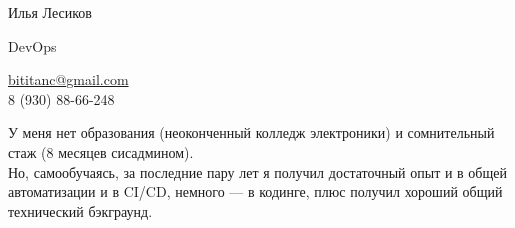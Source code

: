 \documentclass[10pt, a4paper]{article}
\begin{document}
\begin{spacing}{0.3}
{\LARGE Илья Лесиков}\\
\end{spacing}


{\setlength\multicolsep{0pt}%
\begin{multicols}{2}





\begin{spacing}{0.7}
  {\large DevOps}\hspace{1.55cm}{25 лет}\\
\end{spacing}

\columnbreak

\begin{flushright}
    \href{mailto:bititanc@gmail.com}{bititanc@gmail.com}\\
    8 (930) 88-66-248\\
\end{flushright}

\end{multicols}
}

\vspace{30pt}

У меня нет образования (неоконченный колледж электроники) и сомнительный стаж (8 месяцев сисадмином).\\
Но, самообучаясь, за последние пару лет я получил достаточный опыт и в общей автоматизации и в CI/CD, немного — в кодинге, плюс получил хороший общий технический бэкграунд.
\end{document}
